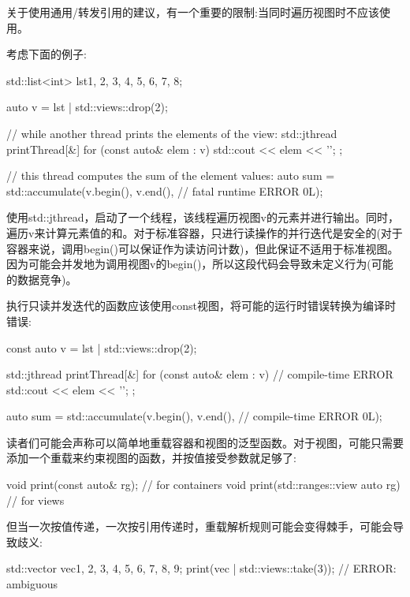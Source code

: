 
关于使用通用/转发引用的建议，有一个重要的限制:当同时遍历视图时不应该使用。

考虑下面的例子:

\begin{cpp}
std::list<int> lst{1, 2, 3, 4, 5, 6, 7, 8};

auto v = lst | std::views::drop(2);

// while another thread prints the elements of the view:
std::jthread printThread{[&] {
		for (const auto& elem : v) {
			std::cout << elem << '\n';
		}
}};

// this thread computes the sum of the element values:
auto sum = std::accumulate(v.begin(), v.end(), // fatal runtime ERROR
0L);
\end{cpp}

使用std::jthread，启动了一个线程，该线程遍历视图v的元素并进行输出。同时，遍历v来计算元素值的和。对于标准容器，只进行读操作的并行迭代是安全的(对于容器来说，调用begin()可以保证作为读访问计数)，但此保证不适用于标准视图。因为可能会并发地为调用视图v的begin()，所以这段代码会导致未定义行为(可能的数据竞争)。

执行只读并发迭代的函数应该使用const视图，将可能的运行时错误转换为编译时错误:

\begin{cpp}
const auto v = lst | std::views::drop(2);

std::jthread printThread{[&] {
		for (const auto& elem : v) { // compile-time ERROR
			std::cout << elem << '\n';
		}
}};

auto sum = std::accumulate(v.begin(), v.end(), // compile-time ERROR
0L);
\end{cpp}


读者们可能会声称可以简单地重载容器和视图的泛型函数。对于视图，可能只需要添加一个重载来约束视图的函数，并按值接受参数就足够了:

\begin{cpp}
void print(const auto& rg); // for containers
void print(std::ranges::view auto rg) // for views
\end{cpp}

但当一次按值传递，一次按引用传递时，重载解析规则可能会变得棘手，可能会导致歧义:

\begin{cpp}
std::vector vec{1, 2, 3, 4, 5, 6, 7, 8, 9};
print(vec | std::views::take(3)); // ERROR: ambiguous
\end{cpp}

